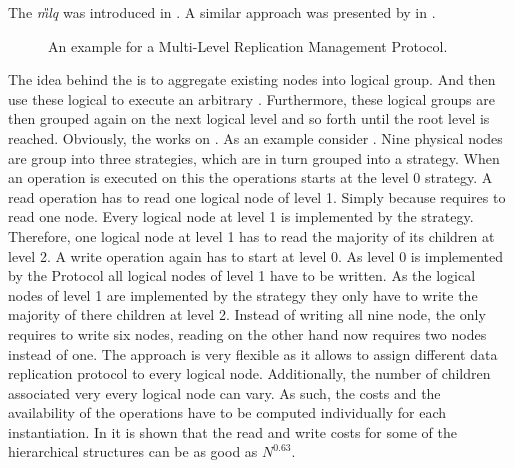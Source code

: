\documentclass[conference]{IEEEtran}
\begin{document}
The \emph{\G{mlq}} was introduced in \cite{AA91:mdv,FKT91:dml}.
A similar approach was presented by \citeauthor{Kum90:pah} in
\cite{Kum90:pah,Kum91:hqc}.
\begin{figure}
		
	\caption{An example for a Multi-Level Replication Management Protocol.}
	\label{fig:multilevel}
\end{figure}
The idea behind the  is to aggregate existing nodes into
logical group.
And then use these logical to execute an arbitrary .
Furthermore, these logical groups are then grouped again on the next logical
level and so forth until the root level is reached.
Obviously, the  works on .
As an example consider .
Nine physical nodes are group into three  strategies, which are in turn
grouped into a  strategy.
When an operation is executed on this  the operations starts at the
level 0  strategy.
A read operation has to read one logical node of level 1.
Simply because  requires to read one node.
Every logical node at level 1 is implemented by the  strategy.
Therefore, one logical node at level 1 has to read the majority of its
children at level 2.
A write operation again has to start at level 0.
As level 0 is implemented by the  Protocol all logical nodes of level
1 have to be written.
As the logical nodes of level 1 are implemented by the  strategy they
only have to write the majority of there children at level 2.
Instead of writing all nine node, the  only requires to write six
nodes, reading on the other hand now requires two nodes instead of one.
The  approach is very flexible as it allows to assign different data
replication protocol to every logical node.
Additionally, the number of children associated very every logical node can
vary.
As such, the costs and the availability of the operations have to be computed
individually for each  instantiation.
In \cite{Kum91:hqc} it is shown that the read and write costs for some of the
hierarchical structures can be as good as \(N^{0.63}\).
\end{document}
